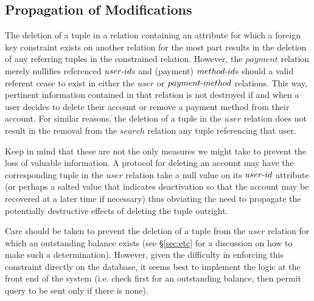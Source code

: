 \documentclass{article}
\newcommand{\tdash}{\textnormal{-}}
\begin{document}
        \subsection{Propagation of Modifications} \label{sec:mods}
            \par The deletion of a tuple in a relation containing an attribute for which a foreign key constraint exists
            on another relation for the most part results in the deletion of any referring tuples in the constrained
            relation. However, the $payment$ relation merely nullifies referenced $user \tdash id$s and (payment)
            $method \tdash id$s should a valid referent cease to exist in either the $user$ or $payment \tdash method$
            relations. This way, pertinent information contained in that relation is not destroyed if and when a user
            decides to delete their account or remove a payment method from their account. For similar reasons, the
            deletion of a tuple in the $user$ relation does not result in the removal from the $search$ relation any
            tuple referencing that user. \par Keep in mind that these are not the only measures we might take to
            prevent the loss of valuable information. A protocol for deleting an account may have the corresponding
            tuple in the $user$ relation take a null value on its $user \tdash id$ attribute (or perhaps a salted value
            that indicates deactivation so that the account may be recovered at a later time if necessary) thus
            obviating the need to propagate the potentially destructive effects of deleting the tuple outright. \par
            Care should be taken to prevent the deletion of a tuple from the $user$ relation for which an outstanding
            balance exists (see \S \ref{sec:etc} for a discussion on how to make such a determination). However, given
            the difficulty in enforcing this constraint directly on the database, it seems best to implement the logic
            at the front end of the system (i.e. check first for an outstanding balance, then permit query to be sent
            only if there is none).
\end{document}

